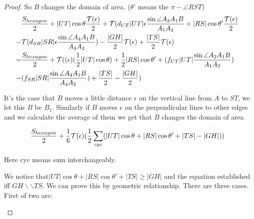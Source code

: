 \begin{proof}
	So $B$ changes the domain of area.
	($\theta'$ means the $\pi - \angle RST$)
	\begin{equation}
		\begin{split}
		&\frac{S_{hexagon}}{2} + |UT|\cos\theta \frac{\T(\epsilon)}{2} + \T(d_{UT}|UT|\epsilon\frac{\sin \angle A_2A_1B}{A_1A_2} + 
		|RS|\cos\theta' \frac{\T(\epsilon)}{2}\\
		-& \T(d_{SR}|SR|\epsilon\frac{\sin \angle A_4A_1B}{A_4A_2}) - \frac{|GH|}{2}\T(\epsilon) + 
		\frac{|TS|}{2}\T(\epsilon)
		\\
		= & \frac{S_{hexagon}}{2} + \T((\epsilon)
		(\frac{1}{2}|UT|\cos\theta )
		+\frac{1}{2}|RS|\cos\theta' +(f_{UT}|UT|\frac{\sin 
		\angle A_2A_1B}{A_1A_2})\\
		- &(f_{SR}|SR|\frac{\sin \angle A_4A_1B}{A_4A_2}) + 
		\frac{|TS|}{2} - \frac{|GH|}{2})
		\end{split}
	\end{equation}
		
	It's the case that $B$ moves a little distance $\epsilon$ 
	on the vertical line from $A$ to $ST$, we let this $B$ be $B_1$. 
	Similarly if $B$ moves $\epsilon$ on the perpendicular lines to 
	other edges and we calculate the average of them we get that $B$ 
	changes the domain of area 
	
	\[ \frac{S_{hexagon}}{2} + \frac{1}{6} \T(\epsilon)(\frac{1}{2}\sum _{cyc}(|UT|\cos\theta+|RS|\cos\theta'+|TS|-|GH|)) \]
		
	Here cyc means sum interchangeably.
		
	We notice that$|UT|\cos\theta + |RS|\cos\theta' + |TS|\geq|GH|$ 
	and the equation established iff $GH \backslash \backslash TS$. 
	We can prove this by geometric relationship. There are three cases.
	First of two are:
		
\begin{center}
	\begin{tikzpicture}[scale=0.6]
		

\end{tikzpicture}
\end{center}
\end{proof}
